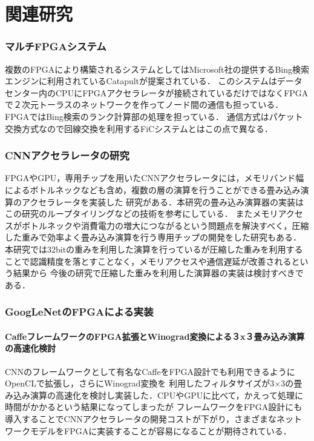 \chapter{関連研究}
{
\label{chap:survey}

\subsection{マルチFPGAシステム}
複数のFPGAにより構築されるシステムとしてはMicrosoft社の提供するBing検索エンジンに利用されているCatapult\cite{catapult1st}が提案されている．
このシステムはデータセンター内のCPUにFPGAアクセラレータが接続されているだけではなくFPGAで２次元トーラスのネットワークを作ってノード間の通信も担っている．
FPGAではBing検索のランク計算部の処理を担っている．
通信方式はパケット交換方式なので回線交換を利用するFiCシステムとはこの点で異なる．

\subsection{CNNアクセラレータの研究}
FPGAやGPU，専用チップを用いたCNNアクセラレータには，メモリバンド幅によるボトルネックなども含め，複数の層の演算を行うことができる畳み込み演算のアクセラレータを実装した
研究\cite{optimized}がある．本研究の畳み込み演算器の実装はこの研究のループタイリングなどの技術を参考にしている．
またメモリアクセスがボトルネックや消費電力の増大につながるという問題点を解決すべく，圧縮した重みで効率よく畳み込み演算を行う専用チップの開発をした研究もある\cite{EIE}．
本研究では32bitの重みを利用した演算を行っているが圧縮した重みを利用することで認識精度を落とすことなく，メモリアクセスや通信遅延が改善されるという結果から
今後の研究で圧縮した重みを利用した演算器の実装は検討すべきである．

\subsection{GoogLeNetのFPGAによる実装}

\subsubsection{CaffeフレームワークのFPGA拡張とWinograd変換による３x３畳み込み演算の高速化検討\cite{caffeinated}}
CNNのフレームワークとして有名なCaffeをFPGA設計でも利用できるようにOpenCLで拡張し，さらにWinograd変換を
利用したフィルタサイズが3$\times$3の畳み込み演算の高速化を検討し実装した．CPUやGPUに比べて，かえって処理に時間がかかるという結果になってしまったが
フレームワークをFPGA設計にも導入することでCNNアクセラレータの開発コストが下がり，さまざまなネットワークモデルをFPGAに実装することが容易になることが期待されている．

}
